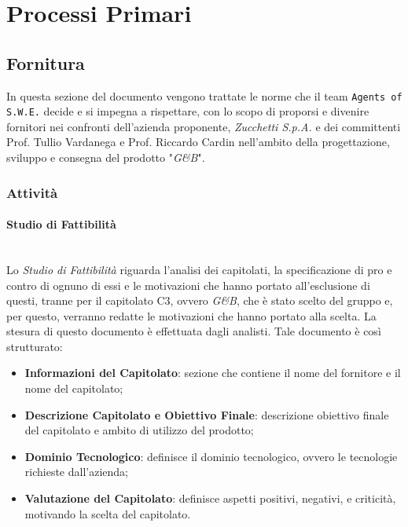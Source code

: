 \section{Processi Primari}\label{ProcessiPrimari}

\subsection{Fornitura}\label{Fornitura}
In questa sezione del documento vengono trattate le norme che il team \texttt{Agents of S.W.E.} decide e si impegna a rispettare, con lo scopo di proporsi e divenire fornitori nei confronti dell'azienda proponente, \textit{Zucchetti S.p.A.} e dei committenti Prof. Tullio Vardanega e Prof. Riccardo Cardin nell'ambito della progettazione, sviluppo e consegna del prodotto "\textit{G\&B}".

\subsubsection{Attività}

\paragraph{Studio di Fattibilità} \label{ProcessiPrimari_Sviluppo_StudioFattibilità} \-\\
Lo \textit{Studio di Fattibilità} riguarda l'analisi dei capitolati, la specificazione di pro e contro di ognuno di essi e le motivazioni che hanno portato all'esclusione di questi, tranne per il capitolato C3, ovvero \textit{G\&B}, che è stato scelto del gruppo e, per questo, verranno redatte le motivazioni che hanno portato alla scelta. La stesura di questo documento è effettuata dagli analisti.
Tale documento è così strutturato:
\begin{itemize}
	\item \textbf{Informazioni del Capitolato}: sezione che contiene il nome del fornitore e il nome del capitolato;
	\item \textbf{Descrizione Capitolato e Obiettivo Finale}: descrizione obiettivo finale del capitolato e ambito di utilizzo del prodotto;
	\item \textbf{Dominio Tecnologico}: definisce il dominio tecnologico, ovvero le tecnologie richieste dall'azienda;
	\item \textbf{Valutazione del Capitolato}: definisce aspetti positivi, negativi, e criticità, motivando la scelta del capitolato.
\end{itemize}

